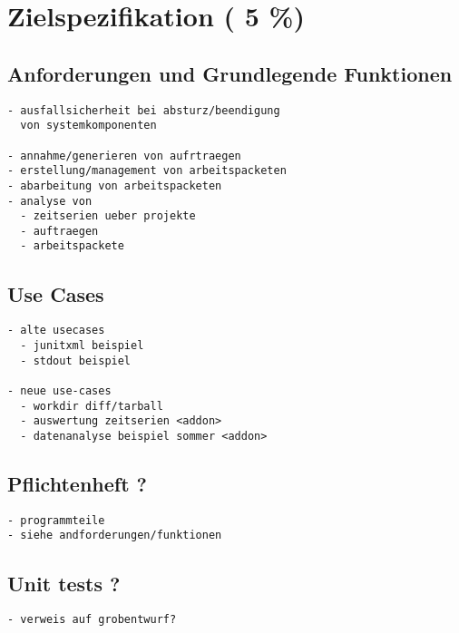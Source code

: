 \chapter{Zielspezifikation ( 5 \%)}





\section{Anforderungen und Grundlegende Funktionen}

\begin{verbatim}
- ausfallsicherheit bei absturz/beendigung
  von systemkomponenten

- annahme/generieren von aufrtraegen
- erstellung/management von arbeitspacketen
- abarbeitung von arbeitspacketen
- analyse von
  - zeitserien ueber projekte
  - auftraegen
  - arbeitspackete
\end{verbatim}

\section{Use Cases}

\begin{verbatim}
- alte usecases
  - junitxml beispiel
  - stdout beispiel

- neue use-cases
  - workdir diff/tarball
  - auswertung zeitserien <addon>
  - datenanalyse beispiel sommer <addon>
\end{verbatim}

\section{Pflichtenheft ?}

\begin{verbatim}
- programmteile
- siehe andforderungen/funktionen

\end{verbatim}

\section{Unit tests ?}


\begin{verbatim}
- verweis auf grobentwurf?

\end{verbatim}

